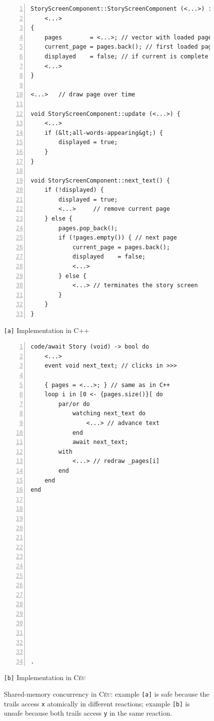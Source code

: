 \documentclass{vgtc}                          %
\newcommand{\CEU}{\textsc{C\'{e}u}\xspace}
\newcommand{\code}[1] {{\small{\texttt{#1}}}}
\newcommand{\ax}{\code{[a]}\xspace}
\newcommand{\bx}{\code{[b]}\xspace}
\begin{document}
\begin{figure}
\begin{minipage}[t]{0.55\linewidth}
\begin{lstlisting}[numbers=left,xleftmargin=3em]
StoryScreenComponent::StoryScreenComponent (<...>) :
    <...>
{
    pages        = <...>; // vector with loaded pages
    current_page = pages.back(); // first loaded page
    displayed    = false; // if current is complete
    <...>
}

<...>   // draw page over time

void StoryScreenComponent::update (<...>) {
    <...>
    if (&lt;all-words-appearing&gt;) {
        displayed = true;
    }
}

void StoryScreenComponent::next_text() {
    if (!displayed) {
        displayed = true;
        <...>     // remove current page
    } else {
        pages.pop_back();
        if (!pages.empty()) { // next page
            current_page = pages.back();
            displayed    = false;
            <...>
        } else {
            <...> // terminates the story screen
        }
    }
}
\end{lstlisting}
\centering\small{\ax Implementation in C++}
\end{minipage}
%
\begin{minipage}[t]{0.45\linewidth}
\begin{lstlisting}[numbers=left,xleftmargin=3em]
code/await Story (void) -> bool do
    <...>
    event void next_text; // clicks in >>>

    { pages = <...>; } // same as in C++
    loop i in [0 <- {pages.size()}[ do
        par/or do
            watching next_text do
                <...> // advance text
            end
            await next_text;
        with
            <...> // redraw _pages[i]
        end
    end
end

















.
\end{lstlisting}
\centering\small{\bx Implementation in \CEU}
\end{minipage}
\caption{ Shared-memory concurrency in \CEU:
example \ax is safe because the trails access \code{x} atomically in different 
reactions;
example \bx is unsafe because both trails access \code{y} in the same reaction.
\label{lst.shared}
}
\end{figure}
\end{document}
